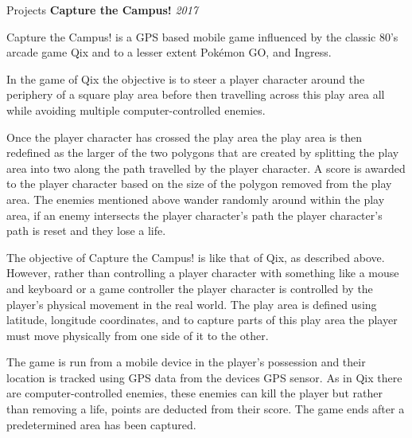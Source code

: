 \documentclass{cv} %
\begin{document}
\begin{rSection}{Projects}
{\bf Capture the Campus!} \hfill {\em 2017} 

\item Capture the Campus! is a GPS based mobile game influenced by the classic 80’s arcade game Qix and to a lesser extent Pokémon GO, and Ingress.

\item In the game of Qix the objective is to steer a player character around the periphery of a square play area before then travelling across this play area all while avoiding multiple computer-controlled enemies.

\item Once the player character has crossed the play area the play area is then redefined as the larger of the two polygons that are created by splitting the play area into two along the path travelled by the player character. A score is awarded to the player character based on the size of the polygon removed from the play area. The enemies mentioned above wander randomly around within the play area, if an enemy intersects the player character’s path the player character’s path is reset and they lose a life.

\item The objective of Capture the Campus! is like that of Qix, as described above. However, rather than controlling a player character with something like a mouse and keyboard or a game controller the player character is controlled by the player’s physical movement in the real world.
The play area is defined using latitude, longitude coordinates, and to capture parts of this play area the player must move physically from one side of it to the other.

\item The game is run from a mobile device in the player’s possession and their location is tracked using GPS data from the devices GPS sensor.
As in Qix there are computer-controlled enemies, these enemies can kill the player but rather than removing a life, points are deducted from their score.
The game ends after a predetermined area has been captured.

\end{rSection}

\end{document}
